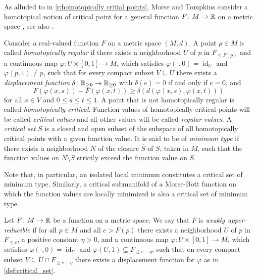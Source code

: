 As alluded to in \cref{r:homotopically critial points}, Morse and Tompkins consider a homotopical notion of critical point for a general function $F \colon M \to \mathbb{R}$ on a metric space \cite[p.~445]{Morse.1939}, see also \cite{Morse.1943}.

\begin{defi}
\label{def:critical_set}
	Consider a real-valued function $F$ on a metric space $(M,d)$.
	A point $p \in M$ is called \emph{homotopically regular} if there exists a neighborhood $U$ of $p$ in $F_{\leq F(p)}$ and a continuous map $\varphi \colon U \times [0,1] \to M$, which satisfies $\varphi(\cdot, 0) = \operatorname{id}_U$ and $\varphi(p,1) \neq p$, such that for every compact subset $V \subseteq U$ there exists a \emph{displacement function} $\delta \colon \mathbb{R}_{\geq 0} \to \mathbb{R}_{\geq 0}$ with
	$\delta(e) = 0$ if and only if $e = 0$, and
	\[
	F(\varphi(x,s)) - F(\varphi(x,t)) \geq \delta(d(\varphi(x,s),\varphi(x,t)))
	\]
	for all $x \in V$ and $0 \leq s \leq t \leq 1$.
	A point that is not homotopically regular is called \emph{homotopically critical}.
	Function values of homotopically critical points will be called \emph{critical values} and all other values will be called \emph{regular values}.
	A \emph{critical set} $S$ is a closed and open subset of the subspace of all homotopically critical points with a given function value.
	It is said to be of \emph{minimum type} if there exists a neighborhood $N$ of the closure $\overline{S}$ of $S$, taken in $M$, such that the function values on $N \setminus S$ strictly exceed the function value on $S$.
\end{defi}

Note that, in particular, an isolated local minimum constitutes a critical set of minimum type. Similarly, a critical submanifold of a Morse-Bott function on which the function values are locally minimized is also a critical set of minimum type.

\begin{defi}
\label{def:upper_reducible}
	Let $F \colon M \to \mathbb{R}$ be a function on a metric space.
	We say that $F$ is \emph{weakly upper-reducible} if for all $p \in M$ and all $c > F(p)$ there exists a neighborhood $U$ of $p$ in $F_{\leq c}$, a positive constant $\eta > 0$, and a continuous map $\varphi \colon U \times [0,1] \to M$, which satisfies $\varphi(\cdot, 0) = \operatorname{id}_U$ and $\varphi(U,1) \subseteq F_{\leq c-\eta}$, such that on every compact subset $V \subseteq U \cap F_{\geq c - \eta}$ there exists a displacement function for $\varphi$ as in \cref{def:critical_set}.
\end{defi}

